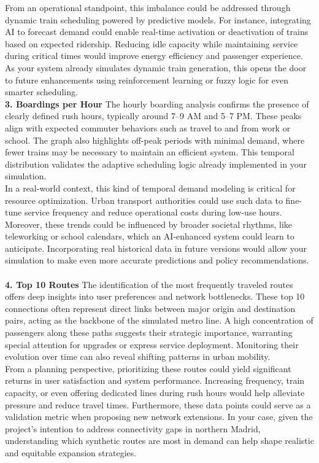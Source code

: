 From an operational standpoint, this imbalance could be addressed through dynamic train scheduling powered by predictive models. For instance, integrating AI to forecast demand could enable real-time activation or deactivation of trains based on expected ridership. Reducing idle capacity while maintaining service during critical times would improve energy efficiency and passenger experience. As your system already simulates dynamic train generation, this opens the door to future enhancements using reinforcement learning or fuzzy logic for even smarter scheduling.
~\\[1cm]
\noindent\textbf{3. Boardings per Hour }
The hourly boarding analysis confirms the presence of clearly defined rush hours, typically around 7–9 AM and 5–7 PM. These peaks align with expected commuter behaviors such as travel to and from work or school. The graph also highlights off-peak periods with minimal demand, where fewer trains may be necessary to maintain an efficient system. This temporal distribution validates the adaptive scheduling logic already implemented in your simulation.
~\\[0,5cm]
In a real-world context, this kind of temporal demand modeling is critical for resource optimization. Urban transport authorities could use such data to fine-tune service frequency and reduce operational costs during low-use hours. Moreover, these trends could be influenced by broader societal rhythms, like teleworking or school calendars, which an AI-enhanced system could learn to anticipate. Incorporating real historical data in future versions would allow your simulation to make even more accurate predictions and policy recommendations.
~\\[0,5cm]
\noindent\textbf{4. Top 10 Routes  }
The identification of the most frequently traveled routes offers deep insights into user preferences and network bottlenecks. These top 10 connections often represent direct links between major origin and destination pairs, acting as the backbone of the simulated metro line. A high concentration of passengers along these paths suggests their strategic importance, warranting special attention for upgrades or express service deployment. Monitoring their evolution over time can also reveal shifting patterns in urban mobility.
~\\[0,5cm]
From a planning perspective, prioritizing these routes could yield significant returns in user satisfaction and system performance. Increasing frequency, train capacity, or even offering dedicated lines during rush hours would help alleviate pressure and reduce travel times. Furthermore, these data points could serve as a validation metric when proposing new network extensions. In your case, given the project's intention to address connectivity gaps in northern Madrid, understanding which synthetic routes are most in demand can help shape realistic and equitable expansion strategies.
